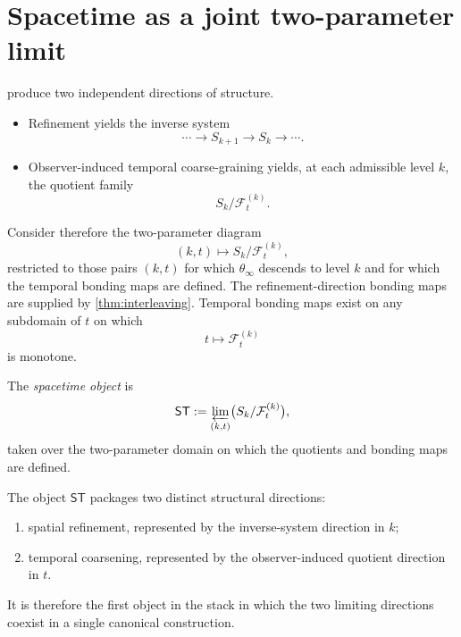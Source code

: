\section{Spacetime as a joint two-parameter limit}
 produce two independent
directions of
structure.
\begin{itemize}
	\item
	      Refinement yields the inverse system
	      \[
		      \cdots \to S_{k+1}\to S_k\to\cdots .
	      \]
	\item
	      Observer-induced temporal coarse-graining yields, at each admissible
	      level \(k\), the quotient family
	      \[
		      S_k/\mathcal F_t^{(k)}.
	      \]
\end{itemize}
Consider therefore the two-parameter diagram
\[
	(k,t)\longmapsto S_k/\mathcal F_t^{(k)},
\]
restricted to those pairs \((k,t)\) for which \(\theta_\infty\)
descends to level \(k\) and for which the temporal bonding maps are
defined.
The refinement-direction bonding maps are supplied by
\cref{thm:interleaving}.  Temporal bonding maps exist on any subdomain
of \(t\) on which
\[
	t\longmapsto \mathcal F_t^{(k)}
\]
is monotone.
\begin{definition}
	The \emph{spacetime object} is
	\[
		\mathsf{ST}
		:=
		\varprojlim_{(k,t)}
		\bigl(S_k/\mathcal F_t^{(k)}\bigr),
	\]
	taken over the two-parameter domain on which the quotients and bonding
	maps are defined.
\end{definition}
\begin{remark}[Interpretation]
	The object \(\mathsf{ST}\) packages two distinct structural directions:
	\begin{enumerate}[label=\textup{(\roman*)}]
		\item
		      spatial refinement, represented by the inverse-system direction in
		      \(k\);
		\item
		      temporal coarsening, represented by the observer-induced quotient
		      direction in \(t\).
	\end{enumerate}
	It is therefore the first object in the stack in which the two limiting
	directions coexist in a single canonical construction.
\end{remark}

